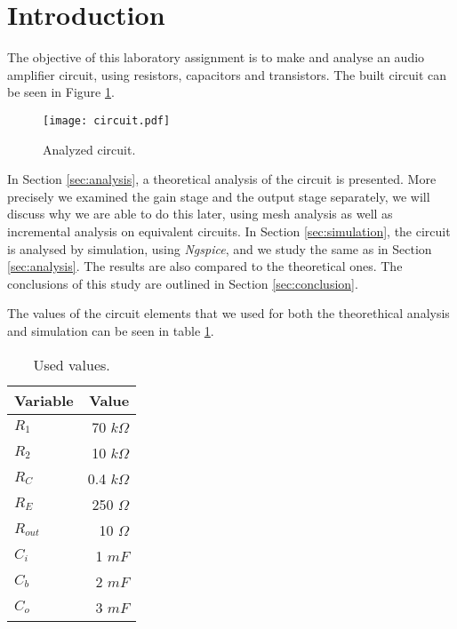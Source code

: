 \section{Introduction}
\label{sec:introduction}

The objective of this laboratory assignment is to make and analyse an audio amplifier circuit, using resistors, capacitors and transistors. The built circuit can be seen in Figure \ref{fig:cir_intro}.

\begin{figure}[H] \centering
\texttt{[image: circuit.pdf]}
\caption{Analyzed circuit.}
\label{fig:cir_intro}
\end{figure}

In Section \ref{sec:analysis}, a theoretical analysis of the circuit is
presented. More precisely we examined the gain stage and the output stage separately, we will discuss why we are able to do this later, using mesh analysis as well as incremental analysis on equivalent circuits.
In Section \ref{sec:simulation}, the circuit is analysed by simulation, using \textit{Ngspice}, and we study the same as in Section \ref{sec:analysis}. The results are also compared to the theoretical ones. The conclusions of this study are outlined in Section \ref{sec:conclusion}.
\par
The values of the circuit elements that we used for both the theorethical analysis and simulation can be seen in table \ref{tab:intro_values}.

\begin{table}[H]
  \centering
  \begin{tabular}{|l|r|}
    \hline
        {\bf Variable} & {\bf Value} \\ \hline
        $R_1$ & 70 $k\Omega$ \\ \hline
        $R_2$ & 10 $k\Omega$ \\ \hline
        $R_C$ & 0.4 $k\Omega$ \\ \hline
        $R_E$ & 250 $\Omega$ \\ \hline
        $R_{out}$ & 10 $\Omega$ \\ \hline
        $C_i$ & 1 $mF$ \\ \hline
        $C_b$ & 2 $mF$ \\ \hline
        $C_o$ & 3 $mF$ \\ \hline
  \end{tabular}
  \caption{Used values.}
  \label{tab:intro_values}
\end{table}
